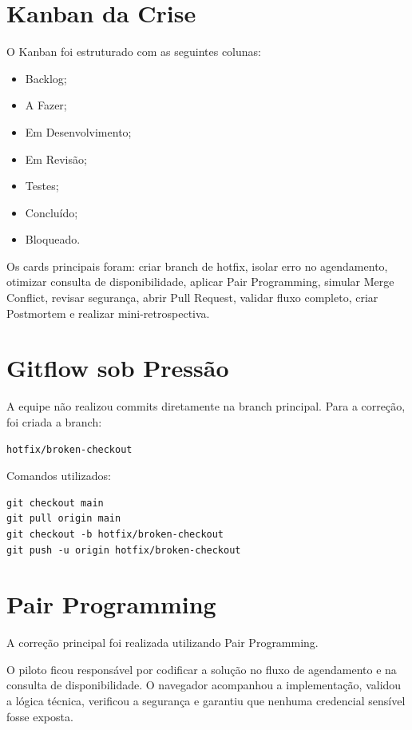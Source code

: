 \documentclass[12pt,a4paper]{article}
\begin{document}
\section{Kanban da Crise}

O Kanban foi estruturado com as seguintes colunas:

\begin{itemize}
    \item Backlog;
    \item A Fazer;
    \item Em Desenvolvimento;
    \item Em Revisão;
    \item Testes;
    \item Concluído;
    \item Bloqueado.
\end{itemize}

Os cards principais foram: criar branch de hotfix, isolar erro no agendamento, otimizar consulta de disponibilidade, aplicar Pair Programming, simular Merge Conflict, revisar segurança, abrir Pull Request, validar fluxo completo, criar Postmortem e realizar mini-retrospectiva.

\section{Gitflow sob Pressão}

A equipe não realizou commits diretamente na branch principal. Para a correção, foi criada a branch:

\begin{verbatim}
hotfix/broken-checkout
\end{verbatim}

Comandos utilizados:

\begin{verbatim}
git checkout main
git pull origin main
git checkout -b hotfix/broken-checkout
git push -u origin hotfix/broken-checkout
\end{verbatim}

\section{Pair Programming}

A correção principal foi realizada utilizando Pair Programming.

O piloto ficou responsável por codificar a solução no fluxo de agendamento e na consulta de disponibilidade. O navegador acompanhou a implementação, validou a lógica técnica, verificou a segurança e garantiu que nenhuma credencial sensível fosse exposta.
\end{document}
